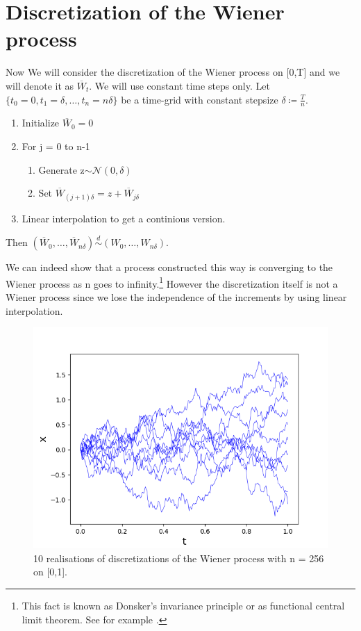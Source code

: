 \section{Discretization of the Wiener process}
Now We will consider the discretization of the Wiener process on [0,T] and we will denote it as \(\overline{W}_t\). We will use constant time steps only. Let \(\{t_0=0, t_1=\delta,\dots, t_n=n\delta\}\) be a time-grid with constant stepsize \(\delta\coloneqq\frac{T}{n}\).
\begin{algorithm}
\begin{enumerate}[noitemsep,topsep=0mm,labelindent=6mm,leftmargin=*,widest=3.,align=right]
\item Initialize \(\overline{W}_0=0\)
\item For j = 0 to n-1
\begin{enumerate}[noitemsep,topsep=0mm,labelindent=6mm,leftmargin=*,widest=3.,align=right]
\item Generate z\(\sim \mathcal{N}(0,\delta)\)
\item Set \(\overline{W}_{(j+1)\delta} = z + \overline{W}_{j\delta}\)
\end{enumerate}
\item Linear interpolation to get a continious version.
\end{enumerate}
Then \((\overline{W}_0, \dots, \overline{W}_{n\delta}) \overset{d}{\sim} (W_0, \dots, W_{n\delta})\).
\end{algorithm}
We can indeed show that a process constructed this way is converging to the Wiener process as n goes to infinity.\footnote{This fact is known as Donsker's invariance principle or as functional central limit theorem. See for example \cite{Klenke}.} However the discretization itself is not a Wiener process since we lose the independence of the increments by using linear interpolation.
\begin{figure}[!h]
\centering
  \includegraphics[scale=0.6]{content/Graphics/Figure_SamplingWienerProcess.png}
  \caption{10 realisations of discretizations of the Wiener process with n = 256 on [0,1].}
  \label{fig:fig1}
\nopagebreak
\end{figure}	

